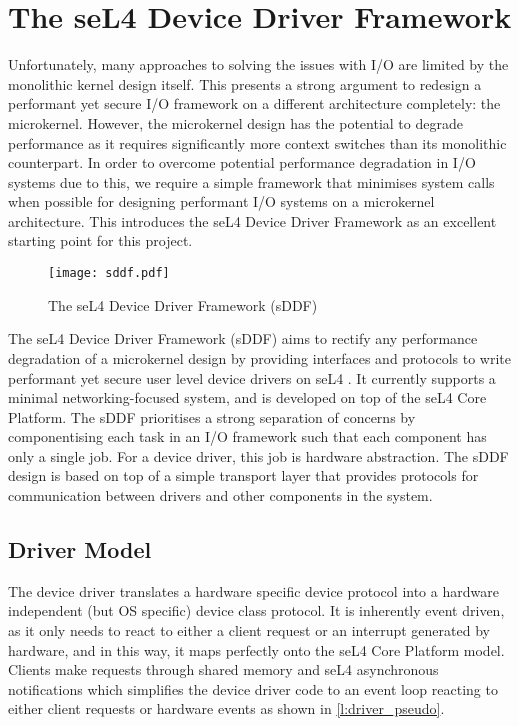 \chapter{The seL4 Device Driver Framework}\label{ch:sddf}
Unfortunately, many approaches to solving the issues with I/O are limited 
by the monolithic kernel design itself. This presents a strong argument to
redesign a performant yet secure I/O framework on a different architecture completely: the microkernel.
However, the microkernel design has the potential to degrade performance as it requires
significantly more context switches than its monolithic counterpart.
In order to overcome potential performance degradation in I/O systems due to this, we require a simple
framework that minimises system calls when possible for designing performant I/O systems on a microkernel architecture.
This introduces the seL4 Device Driver Framework as an excellent starting point for this project.\\

\begin{figure}[h]
    \centering
    \texttt{[image: sddf.pdf]}
    \caption{The seL4 Device Driver Framework (sDDF) \cite{Parker_22:sddf}}
    \label{f:sddf}
\end{figure}

The seL4 Device Driver Framework (sDDF) aims to rectify any performance degradation of a microkernel
design by providing interfaces and protocols to write performant yet secure user level device
drivers on seL4 \cite{Parker_22:sddf}. It currently supports a minimal networking-focused system, and is 
developed on top of the seL4 Core Platform. The sDDF prioritises a strong separation of 
concerns by componentising each task in an I/O framework such that each component has only a 
single job. For a device driver, this job is hardware abstraction. The sDDF design is based on
top of a simple transport layer that provides protocols for communication between drivers and other
components in the system.

\section{Driver Model}\label{s:driver_model}
The device driver translates a hardware specific device protocol into a hardware independent
(but OS specific) device class protocol. It is inherently event driven, as it only needs to react to
either a client request or an interrupt generated by hardware, and in this way, it maps perfectly onto
the seL4 Core Platform model. Clients make requests through shared memory and seL4 asynchronous notifications
which simplifies the device driver code to an event loop reacting to either client requests or hardware
events as shown in \autoref{l:driver_pseudo}. 

